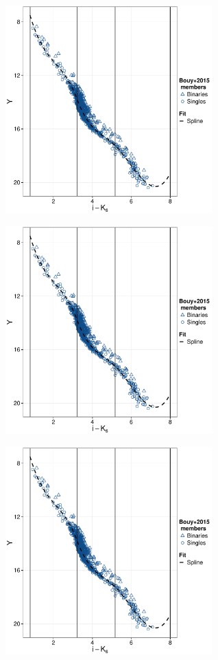 \begin{figure}[ht!]
    \centering
    \begin{subfigure}[t]{0.48\textwidth}
        \includegraphics[page=2,height=8cm,width=\textwidth]{background/Figures/Photometry_fit.pdf}
        \caption{}
    \end{subfigure}
    \begin{subfigure}[t]{0.48\textwidth}
      \includegraphics[page=4,height=8cm,width=\textwidth]{background/Figures/Photometry_fit.pdf}
        \caption{}
    \end{subfigure}
     \begin{subfigure}[t]{0.48\textwidth}
      \includegraphics[page=6,height=8cm,width=\textwidth]{background/Figures/Photometry_fit.pdf}

\end{subfigure}
\end{figure}
